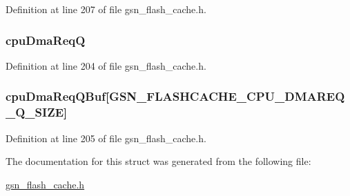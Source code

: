 Definition at line 207 of file gsn\_\-flash\_\-cache.h.

\hypertarget{a00077_a0cfc6093607695c0f61ece0577903e0e}{
\subsubsection[{cpuDmaReqQ}]{ {\bf cpuDmaReqQ}}}
\label{a00077_a0cfc6093607695c0f61ece0577903e0e}


Definition at line 204 of file gsn\_\-flash\_\-cache.h.

\hypertarget{a00077_ac11c28eca3d6ee095cfc57c877110de9}{
\subsubsection[{cpuDmaReqQBuf}]{ {\bf cpuDmaReqQBuf}\mbox{[}GSN\_\-FLASHCACHE\_\-CPU\_\-DMAREQ\_\-Q\_\-SIZE\mbox{]}}}
\label{a00077_ac11c28eca3d6ee095cfc57c877110de9}


Definition at line 205 of file gsn\_\-flash\_\-cache.h.



The documentation for this struct was generated from the following file:\begin{DoxyCompactItemize}
\item 
\hyperlink{a00500}{gsn\_\-flash\_\-cache.h}\end{DoxyCompactItemize}
